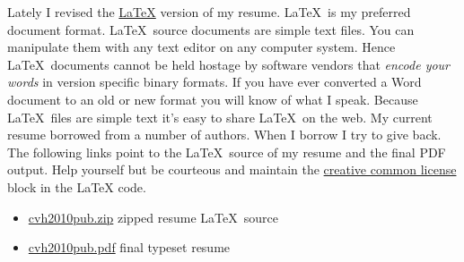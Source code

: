 Lately I revised the \href{http://www.latex-project.org/}{\LaTeX} version
of my resume. \LaTeX\ is my preferred document format. \LaTeX\ source
documents are simple text files. You can manipulate them with any text
editor on any computer system. Hence \LaTeX\ documents cannot be held
hostage by software vendors that \emph{encode your words} in version
specific binary formats. If you have ever converted a Word document to
an old or new format you will know of what I speak. Because \LaTeX\ files
are simple text it's easy to share \LaTeX\ on the web. My current resume
borrowed from a number of authors. When I borrow I try to give back. The
following links point to the \LaTeX\ source of my resume and the final PDF
output. Help yourself but be courteous and maintain the
\href{http://creativecommons.org/licenses/by-nc-sa/1.0/}{creative common
license} block in the LaTeX code.

\begin{itemize}
\item
  \href{http://www.box.net/shared/ef8yxegr0i}{cvh2010pub.zip} zipped
  resume \LaTeX\ source
\item
  \href{http://www.box.net/shared/u27ntub3nr}{cvh2010pub.pdf} final
  typeset resume
\end{itemize}


%